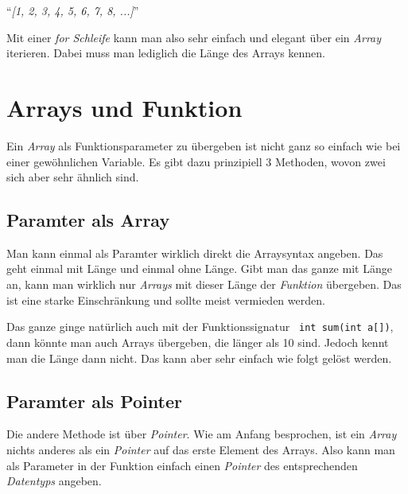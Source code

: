 \documentclass[c_worksheet.tex]{subfiles}
\begin{document}
\begin{center}
``\textit{[1, 2, 3, 4, 5, 6, 7, 8, ...]}'' 
\end{center}

Mit einer \emph{for Schleife} kann man also sehr einfach und elegant über ein \emph{Array} iterieren. Dabei muss man lediglich die Länge des Arrays kennen.


\section{Arrays und Funktion} 

Ein \emph{Array} als Funktionsparameter zu übergeben ist nicht ganz so einfach wie bei einer gewöhnlichen Variable. Es gibt dazu prinzipiell 3 Methoden, wovon zwei sich aber sehr ähnlich sind.

\subsection{Paramter als Array} 

Man kann einmal als Paramter wirklich direkt die Arraysyntax angeben. Das geht einmal mit Länge und einmal ohne Länge. Gibt man das ganze mit Länge an, kann man wirklich nur \emph{Arrays} mit dieser Länge der \emph{Funktion} übergeben. Das ist eine starke Einschränkung und sollte meist vermieden werden.



Das ganze ginge natürlich auch mit der Funktionssignatur \lstinline$ int sum(int a[])$, dann könnte man auch Arrays übergeben, die länger als 10 sind. Jedoch kennt man die Länge dann nicht. Das kann aber sehr einfach wie folgt gelöst werden.
 


\subsection{Paramter als Pointer}

Die andere Methode ist über \emph{Pointer}. Wie am Anfang besprochen, ist ein \emph{Array} nichts anderes als ein \emph{Pointer} auf das erste Element des Arrays. Also kann man als Parameter in der Funktion einfach einen \emph{Pointer} des entsprechenden \emph{Datentyps} angeben.

 
\end{document}
